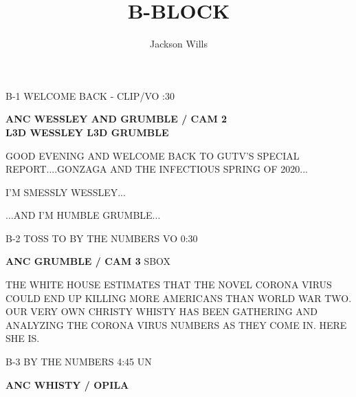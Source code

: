 \documentclass{article}
\title{B-BLOCK}
\author{Jackson Wills}
\newenvironment{changemargin}[2]{%
\begin{list}{}{%
\setlength{\topsep}{0pt}%
\setlength{\leftmargin}{#1}%
\setlength{\rightmargin}{#2}%
\setlength{\listparindent}{\parindent}%
\setlength{\itemindent}{\parindent}%
\setlength{\parsep}{\parskip}%
}%
\item[]}{\end{list}}
\begin{document}
\maketitle
\begin{flushleft}
\begin{changemargin}{-3cm}{-5cm}
\color{red}
B-1     WELCOME BACK - CLIP/VO  :30
\vspace{5mm}

\color{black}
\textbf{
ANC WESSLEY AND GRUMBLE / CAM 2} \\

\textbf{
L3D WESSLEY L3D GRUMBLE
}
\end{changemargin}

\begin{changemargin}{4cm}{1cm}
GOOD EVENING AND WELCOME BACK TO GUTV'S SPECIAL REPORT....GONZAGA AND THE INFECTIOUS SPRING OF 2020...

\vspace{5mm}

I'M SMESSLY WESSLEY...

\vspace{5mm}

...AND I'M HUMBLE GRUMBLE...
\end{changemargin}




\begin{changemargin}{-3cm}{-5cm}
\color{red}
B-2     TOSS TO BY THE NUMBERS  VO  0:30

\color{black}

\textbf{
ANC GRUMBLE / CAM 3}
\color{red}
SBOX
\end{changemargin}

\color{black}
\begin{changemargin}{4cm}{1cm}
THE WHITE HOUSE ESTIMATES THAT THE NOVEL CORONA VIRUS COULD END UP KILLING MORE AMERICANS THAN WORLD WAR TWO. OUR VERY OWN CHRISTY WHISTY HAS BEEN GATHERING AND ANALYZING THE CORONA VIRUS NUMBERS AS THEY COME IN. HERE SHE IS.

\end{changemargin}

\begin{changemargin}{-3cm}{-5cm}
\color{red}
B-3     BY THE NUMBERS  4:45     UN

\color{black}

\textbf{
ANC WHISTY / OPILA}
\\


\end{changemargin}
\end{flushleft}
\end{document}
